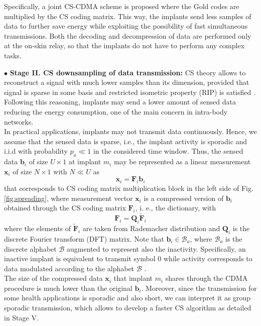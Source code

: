Specifically, a joint CS-CDMA scheme is proposed where the Gold codes are multiplied by the CS coding matrix. This way, the implants send less samples of data to further save energy while exploiting the possibility of fast simultaneous transmissions. Both the decoding and decompression of data are performed only at the on-skin relay, so that the implants do not have to perform any complex tasks.

\noindent $\bullet$ \textbf{Stage II. CS downsampling of data transmission:}
CS theory allows to reconstruct a signal with much lower samples than its dimension, provided that signal is sparse in some basis \cite{CDSP} and restricted isometric property (RIP) is satisfied \cite{candes} \cite{Vizziello}. Following this reasoning, implants may send a lower amount of sensed data reducing the energy consumption, one of the main concern in intra-body networks.\\
In practical applications, implants may not transmit data continuously. Hence, we assume that the sensed data is sparse, i.e., the implant activity is sporadic and i.i.d with probability $p_a\ll 1$ in the considered time window.
Thus, the sensed data $\mathbf{b}_i$ of size $U \times 1$ at implant $m_i$ may be 
represented as a linear measurement $\mathbf{x}_i$ of size $N \times 1$ with $N\ll U$ as
\begin{equation}
{\mathbf{x}_i=\mathbf{F}_i \mathbf{b}_i}
\label{eqCS}
\end{equation}
that corresponds to CS coding matrix multiplication block in the left side of Fig. \ref{fig:spreading}, where measurement vector $\mathbf{x}_i$ is a compressed version of $\mathbf{b}_i$ obtained through the CS coding matrix $\mathbf{F}_i$, i. e., the dictionary, with
\begin{equation}
\mathbf{F}_i=\mathbf{Q}_i \mathbf{\tilde{F}}_i 
\label{eqCDMA2}
\end{equation}
where the elements of $\mathbf{\tilde{F}}_i$ are taken from Rademacher distribution and $\mathbf{Q}_i$ is the discrete Fourier transform (DFT) matrix. 
Note that  $ \mathbf{b}_i \in \mathcal{B}_{a}$, where $\mathcal{B}_{a}$ is the discrete alphabet $\mathcal{B}$ augmented to represent also the inactivity. Specifically, an inactive implant is equivalent to transmit symbol $0$ while  activity corresponds to data modulated according to the alphabet $\mathcal{B}$ \cite{Dekorsy12}.\\ 
The size of the compressed data $\mathbf{x}_i$ that implant $m_i$ shares through the CDMA procedure is much lower than the original $\mathbf{b}_i$.
Moreover, since the transmission for some health applications is sporadic and also short, we can interpret it as  group sporadic transmission, which allows to develop a faster CS algorithm as detailed in Stage V.

